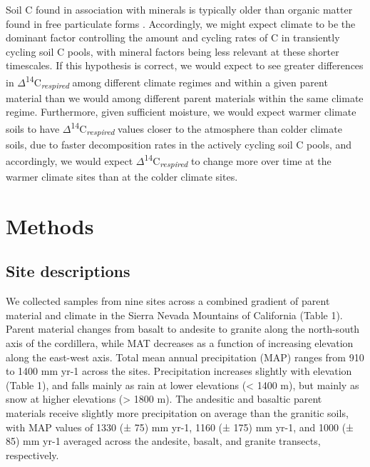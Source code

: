 \documentclass[soil, manuscript]{copernicus}
\begin{document}
Soil C found in association with minerals is typically older than
organic matter found in free particulate forms \citep{lavallee2020}.
Accordingly, we might expect climate to be the dominant factor
controlling the amount and cycling rates of C in transiently cycling
soil C pools, with mineral factors being less relevant at these shorter
timescales. If this hypothesis is correct, we would expect to see
greater differences in
\(\Delta\)\textsuperscript{14}C\textsubscript{\emph{respired}} among
different climate regimes and within a given parent material than we
would among different parent materials within the same climate regime.
Furthermore, given sufficient moisture, we would expect warmer climate
soils to have
\(\Delta\)\textsuperscript{14}C\textsubscript{\emph{respired}} values
closer to the atmosphere than colder climate soils, due to faster
decomposition rates in the actively cycling soil C pools, and
accordingly, we would expect
\(\Delta\)\textsuperscript{14}C\textsubscript{\emph{respired}} to change
more over time at the warmer climate sites than at the colder climate
sites.

\section{Methods}

\subsection{Site descriptions}

We collected samples from nine sites across a combined gradient of
parent material and climate in the Sierra Nevada Mountains of California
(Table 1). Parent material changes from basalt to andesite to granite
along the north-south axis of the cordillera, while MAT decreases as a
function of increasing elevation along the east-west axis. Total mean
annual precipitation (MAP) ranges from 910 to 1400 mm yr-1 across the
sites. Precipitation increases slightly with elevation (Table 1), and
falls mainly as rain at lower elevations (\textless{} 1400 m), but
mainly as snow at higher elevations (\textgreater{} 1800 m). The
andesitic and basaltic parent materials receive slightly more
precipitation on average than the granitic soils, with MAP values of
1330 (± 75) mm yr-1, 1160 (± 175) mm yr-1, and 1000 (± 85) mm yr-1
averaged across the andesite, basalt, and granite transects,
respectively.
\end{document}
